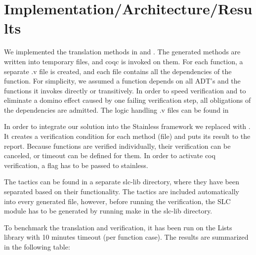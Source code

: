 \section{Implementation/Architecture/Results}

We implemented the translation methods in  and  . The generated methods are written into temporary files, and coqc is invoked on them. For each function, a separate .v file is created, and each file contains all the dependencies of the function. For simplicity, we assumed a function depends on all ADT's and the functions it invokes directly or transitively. In order to speed verification and to eliminate a domino effect caused by one failing verification step, all obligations of the dependencies are admitted. The logic handling .v files can be found in 

In order to integrate our solution into the Stainless framework we replaced  with . It creates a verification condition for each method (file) and puts its result to the report. Because functions are verified individually, their verification can be canceled, or timeout can be defined for them.
%
In order to activate coq verification, a  flag has to be passed to stainless.

The tactics can be found in a separate slc-lib directory, where they have been separated based on their functionality. The tactics are included automatically into every generated file, however, before running the verification, the SLC module has to be generated by running make in the slc-lib directory.

To benchmark the translation and verification, it has been run on the Lists library with 10 minutes timeout (per function case). The results are summarized in the following table: